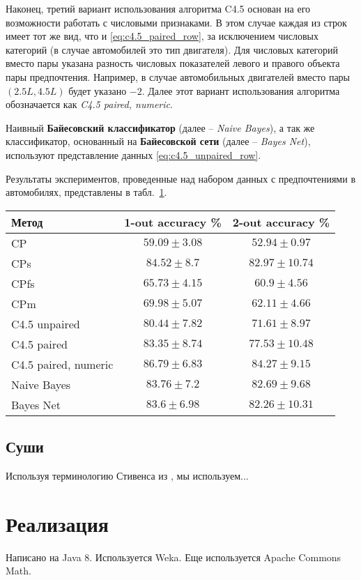 		Наконец, третий вариант использования алгоритма C4.5 основан на его возможности работать с числовыми признаками. В этом случае каждая из строк имеет тот же вид, что и \eqref{eq:c4.5_paired_row}, за исключением числовых категорий (в случае автомобилей это тип двигателя). Для числовых категорий вместо пары указана разность числовых показателей левого и правого объекта пары предпочтения. Например, в случае автомобильных двигателей вместо пары $(2.5L, 4.5L)$ будет указано $-2$. Далее этот вариант использования алгоритма обозначается как \emph{C4.5 paired, numeric}. 
		
		Наивный \textbf{Байесовский классификатор} (далее – \emph{Naive Bayes}), а так же классификатор, основанный на \textbf{Байесовской сети} (далее – \emph{Bayes Net}), используют представление данных \eqref{eq:c4.5_unpaired_row}. 
		
		Результаты экспериментов, проведенные над набором данных с предпочтениями в автомобилях, представлены в табл.~\ref{tbl:cars_results}. %
	
	\begin{table}[hb]
		\centering
		\begin{tabular}{|l|c|c|}
			\hline
			Метод   & 1-out accuracy \% & 2-out accuracy \% \rule{0pt}{2.4ex} \\
			\hline  
			CP & $59.09 \pm 3.08$ & $52.94 \pm 0.97$ \rule{0pt}{2.4ex} \\ 
			CPs & $84.52 \pm 8.7$ & $82.97 \pm 10.74$ \\
			CPfs & $65.73 \pm 4.15$ & $60.9 \pm 4.56$ \\
			CPm & $69.98 \pm 5.07$ & $62.11 \pm 4.66$ \\ 
			C4.5 unpaired & $80.44 \pm 7.82$ & $71.61 \pm 8.97$ \\ 
			C4.5 paired  & $83.35 \pm 8.74$ & $77.53 \pm 10.48$ \\ 
			C4.5 paired, numeric & $86.79 \pm 6.83$ & $84.27 \pm 9.15$ \\
			Naive Bayes  & $83.76 \pm 7.2$ & $82.69 \pm 9.68$ \\ 
			Bayes Net  & $83.6 \pm 6.98$ & $82.26 \pm 10.31$ \\ 
			\hline
		\end{tabular}
		\label{tbl:cars_results}
	\end{table}
	
	
	\subsection{Суши} 
	\label{subsec:exp_sushi}

	Используя терминологию Стивенса из \cite{Stevens:1951}, мы используем...

\section{Реализация}
	Написано на Java 8. Используется Weka. Еще используется Apache Commons Math.
